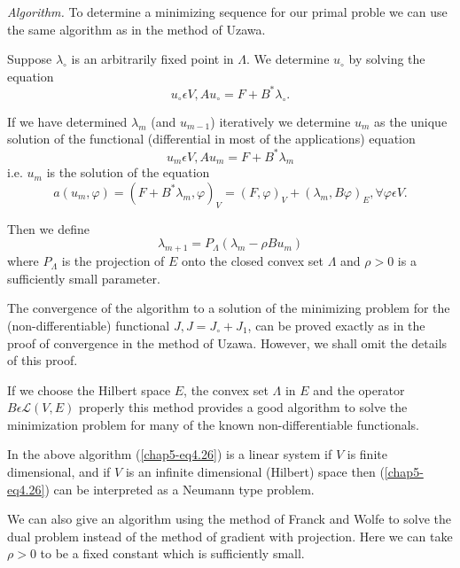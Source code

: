 {\em Algorithm.} To determine a minimizing sequence for our primal proble we can use the same algorithm as in the method of Uzawa.

Suppose $\lambda_{\circ}$ is an arbitrarily fixed point in $\Lambda$. We determine $u_{\circ}$ by solving the equation
\begin{equation*}
u_{\circ} \epsilon V, Au_{\circ} = F + B^{*} \lambda_{\circ}.\tag{4.25}\label{chap5-eq4.25}
\end{equation*}\pageoriginale

If we have determined $\lambda_{m}$ (and $u_{m-1}$) iteratively we determine $u_{m}$ as the unique solution of the functional (differential in most of the applications) equation
\begin{equation*}
u_{m} \epsilon V, Au_{m} = F + B^{*} \lambda_{m}\tag{4.26}\label{chap5-eq4.26}
\end{equation*}
i.e. $u_{m}$ is the solution of the equation
\begin{equation*}
a(u_{m}, \varphi) = (F + B^{*} \lambda_{m}, \varphi)_{V} = (F, \varphi)_{V} + (\lambda_{m}, B \varphi)_{E}, \forall \varphi \epsilon V.\tag*{$(4.26)'$}\label{chap5-eq4.26'}
\end{equation*}

Then we define
\begin{equation*}
\lambda_{m+1} = P_{\Lambda} (\lambda_{m} - \rho Bu_{m})\tag{4.27}\label{chap5-eq4.27}
\end{equation*}
where $P_{\Lambda}$ is the projection of $E$ onto the closed convex set $\Lambda$ and $\rho > 0$ is a sufficiently small parameter.

The convergence of the algorithm to a solution of the minimizing problem for the (non-differentiable) functional $J, J = J_{\circ} + J_{1}$, can be proved exactly as in the proof of convergence in the method of Uzawa. However, we shall omit the details of this proof.

\begin{remark}\label{chap5-rem4.2}
If we choose the Hilbert space $E$, the convex set $\Lambda$ in $E$ and the operator $B \epsilon \mathscr{L} (V, E)$ properly this method provides a good algorithm to solve the minimization problem for many of the known non-differentiable functionals.
\end{remark}

\begin{remark}\label{chap5-rem4.3}
In the above algorithm (\ref{chap5-eq4.26}) is a linear system if $V$ is finite dimensional, and if $V$ is an infinite dimensional (Hilbert) space then (\ref{chap5-eq4.26}) can be interpreted as a Neumann type problem.
\end{remark}

\begin{remark}\label{chap5-rem4.4}
We can also give an algorithm using the method of Franck and Wolfe to solve the dual problem instead of the method of gradient with projection. Here we can take $\rho > 0$ to be a fixed constant which is sufficiently small.
\end{remark}
